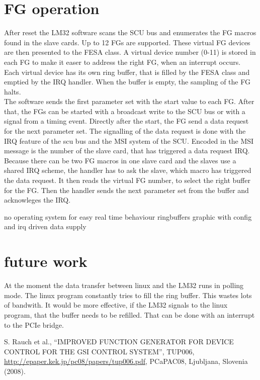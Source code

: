 \documentclass[a4paper,
              ]{jacow}
\begin{document}
\section{FG operation}
After reset the LM32 software scans the SCU bus and enumerates the FG macros found in the slave cards. Up to 12 FGs are supported. These virtual FG devices are then presented to the FESA class. A virtual device number (0-11) is stored in each FG to make it easer to address the right FG, when an interrupt occurs.
Each virtual device has its own ring buffer, that is filled by the FESA class and emptied by the IRQ handler.
When the buffer is empty, the sampling of the FG halts.\\
The software sends the first parameter set with the start value to each FG. After that, the FGs can be started with a broadcast write to the SCU bus or with a signal from a timing event. Directly after the start, the FG send a data request for the next parameter set. The signalling of the data request is done with the IRQ feature of the scu bus and the MSI system of the SCU. Encoded in the MSI message is the number of the slave card, that has triggered a data request IRQ. Because there can be two FG macros in one slave card and the slaves use a shared IRQ scheme, the handler has to ask the slave, which macro has triggered the data request. It then reads the virtual FG number, to select the right buffer for the FG. Then the handler sends the next parameter set from the buffer and acknowleges the IRQ.


no operating system for easy real time behaviour
ringbuffers
graphic with config and irq driven data supply
\section{future work}
At the moment the data transfer between linux and the LM32 runs in polling mode. The linux program constantly tries to fill the ring buffer. This wastes lots of bandwith. It would be more effective, if the LM32 signals to the linux program, that the buffer needs to be refilled. That can be done with an interrupt to the PCIe bridge.


%
%
\iftrue   %
	\newpage
	\raggedend
\fi


\iffalse  %
	\newpage
	\printbibliography

\else
\begin{thebibliography}{9}   %

    S. Rauch et al., ``IMPROVED FUNCTION GENERATOR FOR
	 DEVICE CONTROL FOR THE GSI CONTROL SYSTEM'',
    TUP006, \url{http://epaper.kek.jp/pc08/papers/tup006.pdf}, PCaPAC08, Ljubljana, Slovenia (2008).

\end{thebibliography}
\fi
\end{document}
